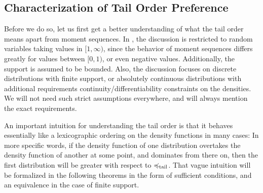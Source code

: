 \documentclass[a4paper]{scrreprt}
\theoremstyle{definition}
\begin{document}
    \subsection{Characterization of Tail Order Preference}
    Before we do so, let us first get a better understanding of what the tail order means apart from moment sequences.
    In \cite{bib:rassGameRiskManagI}, the discussion is restricted to random variables taking values in $[1, \infty)$, since the behavior of moment sequences differs greatly for values between $[0, 1)$, or even negative values. Additionally, the support is assumed to be bounded. Also, the discussion focuses on discrete distributions with finite support, or absolutely continuous distributions with additional requirements continuity/differentiability constraints on the densities.
    We will not need such strict assumptions everywhere, and will always mention the exact requirements.
    
    An important intuition for understanding the tail order is that it behaves essentially like a lexicographic ordering on the density functions in many cases: In more specific words, if the density function of one distribution overtakes the density function of another at some point, and dominates from there on, then the first distribution will be greater with respect to $\preccurlyeq_{\text{tail}}$.
    That vague intuition will be formalized in the following theorems in the form of sufficient conditions, and an equivalence in the case of finite support.
    
\end{document}
